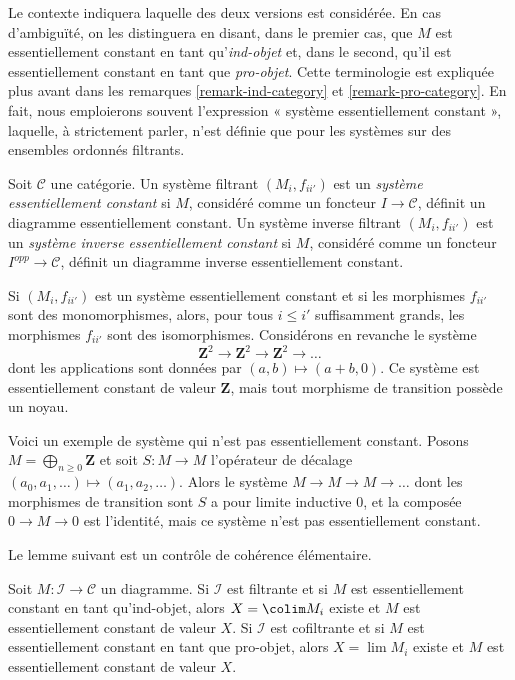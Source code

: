 \noindent
Le contexte indiquera laquelle des deux versions est considérée. En cas
d'ambiguïté, on les distinguera en disant, dans le premier cas, que $M$ est
essentiellement constant en tant qu'{\it ind-objet} et, dans le second, qu'il
est essentiellement constant en tant que {\it pro-objet}. Cette terminologie
est expliquée plus avant dans les remarques \ref{remark-ind-category} et
\ref{remark-pro-category}. En fait, nous emploierons souvent l'expression
« système essentiellement constant », laquelle, à strictement parler, n'est
définie que pour les systèmes sur des ensembles ordonnés filtrants.

\begin{definition}
\label{definition-essentially-constant-system}
Soit $\mathcal{C}$ une catégorie. Un système filtrant
$(M_i, f_{ii'})$ est un {\it système essentiellement constant} si $M$,
considéré comme un foncteur $I \to \mathcal{C}$, définit un diagramme
essentiellement constant. Un système inverse filtrant $(M_i, f_{ii'})$ est
un {\it système inverse essentiellement constant} si $M$, considéré comme un
foncteur $I^{opp} \to \mathcal{C}$, définit un diagramme inverse
essentiellement constant.
\end{definition}

\noindent
Si $(M_i, f_{ii'})$ est un système essentiellement constant et si les
morphismes $f_{ii'}$ sont des monomorphismes, alors, pour tous
$i \leq i'$ suffisamment grands, les morphismes $f_{ii'}$ sont des
isomorphismes. Considérons en
revanche le système
$$
\mathbf{Z}^2 \to \mathbf{Z}^2 \to \mathbf{Z}^2 \to \ldots
$$
dont les applications sont données par $(a, b) \mapsto (a + b, 0)$. Ce
système est essentiellement constant de valeur $\mathbf{Z}$, mais tout
morphisme de transition possède un noyau.

\medskip\noindent
Voici un exemple de système qui n'est pas essentiellement constant. Posons
$M = \bigoplus_{n \geq 0} \mathbf{Z}$ et soit $S : M \to M$ l'opérateur de
décalage $(a_0, a_1, \ldots) \mapsto (a_1, a_2, \ldots)$. Alors le système
$M \to M \to M \to \ldots$ dont les morphismes de transition sont $S$ a
pour limite inductive $0$, et la composée $0 \to M \to 0$ est l'identité,
mais ce système n'est pas essentiellement constant.

\medskip\noindent
Le lemme suivant est un contrôle de cohérence élémentaire.

\begin{lemma}
\label{lemma-essentially-constant-is-limit-colimit}
Soit $M : \mathcal{I} \to \mathcal{C}$ un diagramme.
Si $\mathcal{I}$ est filtrante et si $M$ est essentiellement constant en tant
qu'ind-objet, alors $X = \colim M_i$ existe et $M$ est essentiellement
constant de valeur $X$.
Si $\mathcal{I}$ est cofiltrante et si $M$ est essentiellement constant en
tant que pro-objet, alors $X = \lim M_i$ existe et $M$ est essentiellement
constant de valeur $X$.
\end{lemma}


